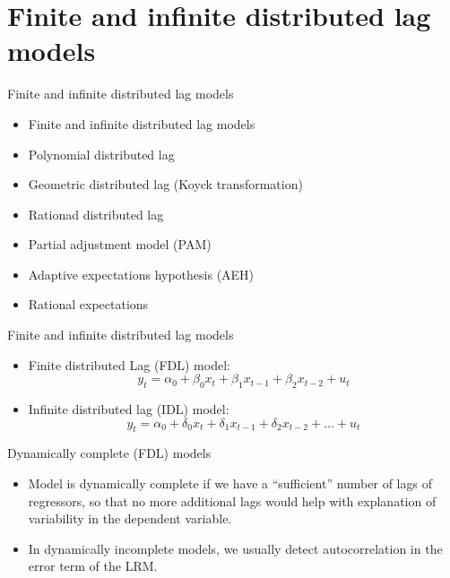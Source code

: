 \documentclass{beamer}
\begin{document}
\section{Finite and infinite distributed lag models}
\begin{frame}{Finite and infinite distributed lag models}
\begin{itemize}
    \item Finite and infinite distributed lag models
    \medskip
    \item Polynomial distributed lag
    \medskip
    \item Geometric distributed lag (Koyck transformation)
    \medskip
    \item Rationad distributed lag
    \medskip
    \item Partial adjustment model (PAM)
    \medskip
    \item Adaptive expectations hypothesis (AEH)
    \medskip
    \item Rational expectations
\end{itemize}
\end{frame}
\begin{frame}{Finite and infinite distributed lag models}
\begin{itemize}
  \item Finite distributed Lag (FDL) model:
  $$ y_t = \alpha_0 + \beta_0 x_t + \beta_1 x_{t-1} + \beta_2 x_{t-2} + u_t $$
  \item Infinite distributed lag (IDL) model:
  $$ y_t = \alpha_0 + \delta_0 x_t + \delta_1 x_{t-1} + \delta_2 x_{t-2} + \dots + u_t $$
  \end{itemize}
Dynamically complete (FDL) models
\vspace{0.5cm}
\begin{itemize}
\item Model is dynamically complete if we have a ``sufficient'' number of lags of regressors, so that no more additional lags would help with explanation of variability in the dependent variable. 
\smallskip
\item In dynamically incomplete models, we usually detect autocorrelation in the error term of the LRM.
\end{itemize}
\end{frame}
\end{document}
